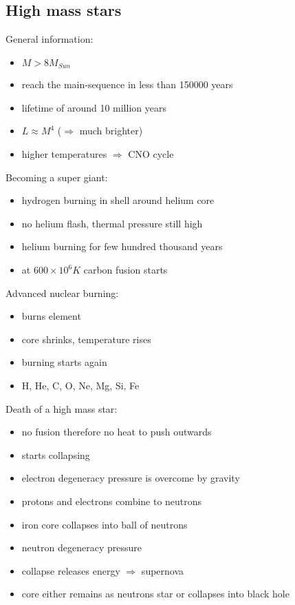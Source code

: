 \documentclass{article}
\theoremstyle{sltheorem}
\begin{document}
\subsection{High mass stars}
General information:
\begin{itemize}
	\item $M > 8M_{Sun}$
	\item reach the main-sequence in less than 150000 years
	\item lifetime of around 10 million years
	\item $L\approx M^4$ ($\Rightarrow$ much brighter)
	\item higher temperatures $\Rightarrow$ CNO cycle
\end{itemize}
Becoming a super giant:
\begin{itemize}
	\item hydrogen burning in shell around helium core
	\item no helium flash, thermal pressure still high
	\item helium burning for few hundred thousand years
	\item at $600 \times 10^6K$ carbon fusion starts
\end{itemize}
Advanced nuclear burning:
\begin{itemize}
	\item burns element
	\item core shrinks, temperature rises
	\item burning starts again
	\item H, He, C, O, Ne, Mg, Si, Fe
\end{itemize}
Death of a high mass star:
\begin{itemize}
	\item no fusion therefore no heat to push outwards
	\item starts collapsing
	\item electron degeneracy pressure is overcome by gravity
	\item protons and electrons combine to neutrons
	\item iron core collapses into ball of neutrons
	\item neutron degeneracy pressure
	\item collapse releases energy $\Rightarrow$ supernova
	\item core either remains as neutrons star or collapses into black hole
\end{itemize}
\end{document}
